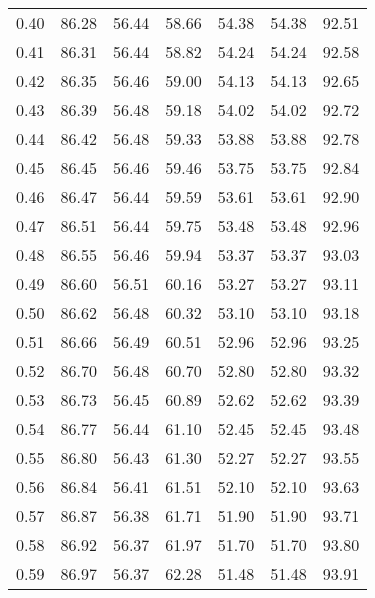 \begin{tabular}{|c|c|c|c|c|c|c|}
      0.40 &     86.28 &     56.44 &      58.66 &   54.38 &      54.38 &         92.51 \\
      0.41 &     86.31 &     56.44 &      58.82 &   54.24 &      54.24 &         92.58 \\
      0.42 &     86.35 &     56.46 &      59.00 &   54.13 &      54.13 &         92.65 \\
      0.43 &     86.39 &     56.48 &      59.18 &   54.02 &      54.02 &         92.72 \\
      0.44 &     86.42 &     56.48 &      59.33 &   53.88 &      53.88 &         92.78 \\
      0.45 &     86.45 &     56.46 &      59.46 &   53.75 &      53.75 &         92.84 \\
      0.46 &     86.47 &     56.44 &      59.59 &   53.61 &      53.61 &         92.90 \\
      0.47 &     86.51 &     56.44 &      59.75 &   53.48 &      53.48 &         92.96 \\
      0.48 &     86.55 &     56.46 &      59.94 &   53.37 &      53.37 &         93.03 \\
      0.49 &     86.60 &     56.51 &      60.16 &   53.27 &      53.27 &         93.11 \\
      0.50 &     86.62 &     56.48 &      60.32 &   53.10 &      53.10 &         93.18 \\
      0.51 &     86.66 &     56.49 &      60.51 &   52.96 &      52.96 &         93.25 \\
      0.52 &     86.70 &     56.48 &      60.70 &   52.80 &      52.80 &         93.32 \\
      0.53 &     86.73 &     56.45 &      60.89 &   52.62 &      52.62 &         93.39 \\
      0.54 &     86.77 &     56.44 &      61.10 &   52.45 &      52.45 &         93.48 \\
      0.55 &     86.80 &     56.43 &      61.30 &   52.27 &      52.27 &         93.55 \\
      0.56 &     86.84 &     56.41 &      61.51 &   52.10 &      52.10 &         93.63 \\
      0.57 &     86.87 &     56.38 &      61.71 &   51.90 &      51.90 &         93.71 \\
      0.58 &     86.92 &     56.37 &      61.97 &   51.70 &      51.70 &         93.80 \\
      0.59 &     86.97 &     56.37 &      62.28 &   51.48 &      51.48 &         93.91 \\

\end{tabular}
